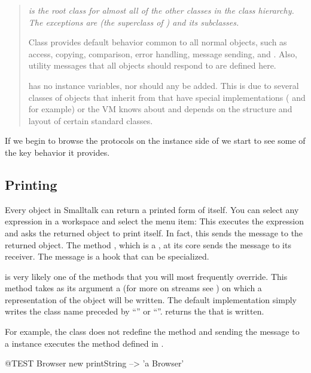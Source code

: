 \documentclass[a4paper,10pt,twoside]{book}
\begin{document}
\begin{quote}\itshape
     is the root class for almost all of the other classes in the class hierarchy.
    The exceptions are  (the superclass of ) and its subclasses.

    Class  provides default behavior common to all normal objects, such as access, copying, comparison, error handling, message sending, and .
    Also, utility messages that all objects should respond to are defined here.

     has no instance variables, nor should any be added.
    This is due to several classes of objects that inherit from  that have special implementations ( and  for example) or the VM knows about and depends on the structure and layout of certain standard classes.
\end{quote}

If we begin to browse the protocols on the instance side of  we start to see some of the key behavior it provides.

\subsection{Printing}
Every object in Smalltalk can return a printed form of itself.
You can select any expression in a workspace and select the  menu item:
This executes the expression and asks the returned object to print itself.
In fact, this sends the message  to the returned object.
The method , which is a , at its core sends the message  to its receiver.
The message  is a hook that can be specialized.

 is very likely one of the methods that you will most frequently override.
This method takes as its argument a  (for more on streams see ) on which a  representation of the object will be written.
The default implementation simply writes the class name preceded by ``'' or ``''.
 returns the  that is written.

For example, the class  does not redefine the method  and sending the message  to a  instance executes the method defined in .
\begin{code}{@TEST}
Browser new printString --> 'a Browser'
\end{code}
\end{document}
